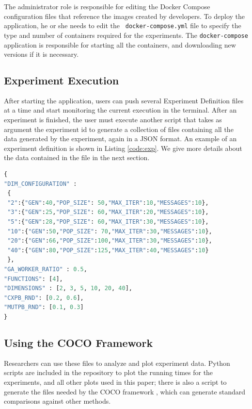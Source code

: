 \documentclass[review]{elsarticle}
\begin{document}
The administrator role is responsible for
editing the Docker Compose configuration files that reference the images created
by developers. To deploy the application, he or she needs to edit the {\tt
docker-compose.yml} file to specify the type and number of containers required
for the experiments. The {\tt docker-compose} application is responsible for
starting all the containers, and downloading new versions if it is necessary.


\subsection{Experiment Execution}
\label{sec:exeperimentalDefinition}

After starting the application, users can push several Experiment Definition 
files at a time and start monitoring the current execution in the terminal.
After an experiment is finished, the user must execute another script
that takes as argument the experiment id to generate a collection of files containing all the
data generated by the experiment, again in a JSON format. An example of an 
experiment definition is shown in Listing \ref{code:exp}. We give more details about the 
data contained in the file in the next section.

\begin{lstlisting}[language=Python, caption=Experiment definition example, label=code:exp]
{
"DIM_CONFIGURATION" : 
 {
 "2":{"GEN":40,"POP_SIZE": 50,"MAX_ITER":10,"MESSAGES":10},
 "3":{"GEN":25,"POP_SIZE": 60,"MAX_ITER":20,"MESSAGES":10},
 "5":{"GEN":28,"POP_SIZE": 60,"MAX_ITER":30,"MESSAGES":10},
 "10":{"GEN":50,"POP_SIZE": 70,"MAX_ITER":30,"MESSAGES":10},
 "20":{"GEN":66,"POP_SIZE":100,"MAX_ITER":30,"MESSAGES":10},
 "40":{"GEN":80,"POP_SIZE":125,"MAX_ITER":40,"MESSAGES":10}
 },
"GA_WORKER_RATIO" : 0.5,
"FUNCTIONS": [4],
"DIMENSIONS" : [2, 3, 5, 10, 20, 40],
"CXPB_RND": [0.2, 0.6],
"MUTPB_RND": [0.1, 0.3]
}
\end{lstlisting}

\subsection{Using the COCO Framework}

Researchers can use these files to analyze and plot experiment data.  Python
scripts are included in the repository to plot the running times for the
experiments, and all other plots used in this paper;  there is also a script to
generate the files needed by the COCO framework \cite{hansen2016coco}, which can generate standard
comparisons against other methods.
\end{document}
